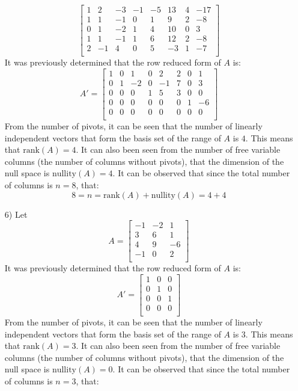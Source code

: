 \documentclass{article}
\begin{document}
\begin{itemize}
\[\begin{bmatrix}
1 &  2 & -3 & -1 & -5 &  13 & 4 & -17 \\
1 &  1 & -1 &  0 &  1 &    9 &  2 &   -8 \\
0 &  1 & -2 &  1 &  4 &  10 &  0 &    3 \\
1 &  1 & -1 &  1 &  6 &  12 &  2 &   -8 \\ 
2 & -1 &  4 &  0 &  5 &  -3 &  1 &   -7 \\ 
\end{bmatrix}\]
It was previously determined that the row reduced form of \(A\) is: 
\[A' = \begin{bmatrix}
1 & 0 &  1 & 0 &  2 &  2 & 0 &  1 \\
0 & 1 & -2 & 0 & -1 & 7 & 0 &  3 \\
0 & 0 &  0 & 1 &  5 &  3 & 0 &  0 \\
0 & 0 &  0 & 0 &  0 &  0 & 1 & -6 \\ 
0 & 0 &  0 & 0 &  0 &  0 & 0 &  0 \\
\end{bmatrix}\]
From the number of pivots, it can be seen that the number of linearly independent vectors that form the basis set of the range of \(A\) is \(4\). This means that \(\text{rank}(A) = 4\). It can also been seen from the number of free variable columns (the number of columns without pivots), that the dimension of the null space is \(\text{nullity}(A) = 4\). It can be observed that since the total number of columns is \(n = 8\), that:
\[8 = n = \text{rank}(A) + \text{nullity}(A) = 4 + 4\] 
\item[6)] Let \[A = \begin{bmatrix}
-1 & -2 &  1 \\
 3 &  6 &  1 \\
 4 &  9 & -6 \\
-1 &  0 &  2 \\ 
\end{bmatrix}\]
It was previously determined that the row reduced form of \(A\) is: 
\[A' = \begin{bmatrix}
1 & 0 & 0 \\
0 & 1 & 0 \\
0 & 0 & 1 \\
0 & 0 & 0 \\ 
\end{bmatrix}\]
From the number of pivots, it can be seen that the number of linearly independent vectors that form the basis set of the range of \(A\) is \(3\). This means that \(\text{rank}(A) = 3\). It can also been seen from the number of free variable columns (the number of columns without pivots), that the dimension of the null space is \(\text{nullity}(A) = 0\). It can be observed that since the total number of columns is \(n = 3\), that:

\end{itemize}
\end{document}
